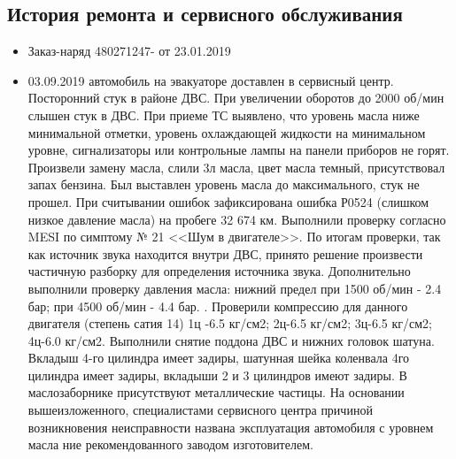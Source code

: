 \subsection{История ремонта и сервисного обслуживания }
\begin{itemize}
	\item  Заказ-наряд 480271247- от 23.01.2019
\item 03.09.2019 автомобиль на эвакуаторе доставлен в сервисный центр. Посторонний стук в районе ДВС.  При увеличении оборотов до 2000 об/мин слышен стук в ДВС. При приеме ТС выявлено, что уровень масла ниже минимальной отметки, уровень охлаждающей жидкости на минимальном уровне, сигнализаторы или контрольные лампы на панели приборов не горят. Произвели замену масла, слили 3л масла, цвет масла темный, присутствовал запах бензина. Был выставлен уровень масла до максимального, стук не прошел. При считывании ошибок зафиксирована ошибка Р0524 (слишком низкое давление масла) на пробеге 32 674 км. Выполнили проверку согласно MESI по симптому № 21 <<Шум в двигателе>>. По итогам проверки, так как источник звука находится внутри ДВС, принято решение произвести частичную разборку для определения источника звука. Дополнительно выполнили проверку давления масла: нижний предел при 1500 об/мин - 2.4 бар; при 4500 об/мин - 4.4 бар. . Проверили компрессию для данного двигателя (степень сатия 14) 1ц -6.5 кг/см2; 2ц-6.5 кг/см2; 3ц-6.5 кг/см2; 4ц-6.0 кг/см2. Выполнили снятие поддона ДВС и нижних головок шатуна. Вкладыш 4-го цилиндра имеет задиры, шатунная шейка коленвала 4го цилиндра имеет задиры, вкладыши 2 и 3 цилиндров имеют задиры. В маслозаборнике присутствуют металлические частицы.  На основании вышеизложенного, специалистами сервисного центра причиной возникновения неисправности названа эксплуатация автомобиля  с уровнем масла ние рекомендованного заводом изготовителем.
\end{itemize}

